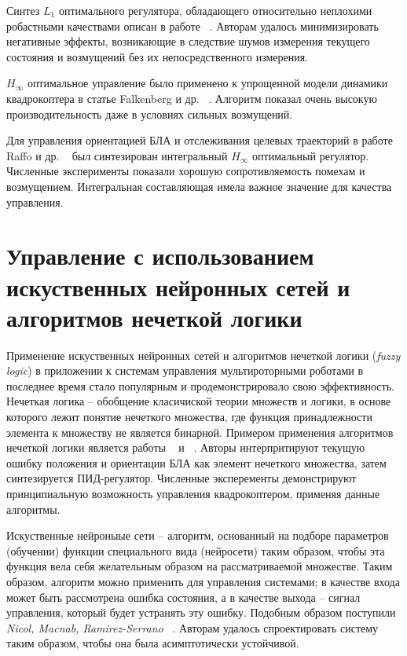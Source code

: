 Синтез $L_1$ оптимального регулятора, обладающего относительно неплохими робастными качествами описан в работе ~\cite{Satici01}. Авторам удалось минимизировать негативные эффекты, возникающие в следствие шумов измерения текущего состояния и возмущений без их непосредственного измерения.

$H_{\infty}$ оптимальное управление было применено к упрощенной модели динамики квадрокоптера в статье Falkenberg и др. ~\cite{Falkenberg01}. Алгоритм показал очень высокую производительность даже в условиях сильных возмущений.

Для управления ориентацией БЛА и отслеживания целевых траекторий в работе Raffo и др. ~\cite{Raffo01} был синтезирован интегральный $H_{\infty}$ оптимальный регулятор. Численные эксперименты показали хорошую сопротивляемость помехам и возмущением. Интегральная составляющая имела важное значение для качества управления.

\section{Управление с использованием искуственных нейронных сетей и алгоритмов нечеткой логики}

Применение искуственных нейронных сетей и алгоритмов нечеткой логики (\textit{fuzzy logic}) в приложении к системам управления мультироторными роботами в последнее время стало популярным и продемонстрировало свою эффективность. Нечеткая логика  -- обобщение класичиской теории множеств и логики, в основе которого лежит понятие нечеткого множества, где функция принадлежности элемента к множеству не является бинарной. Примером применения алгоритмов нечеткой логики является работы ~\cite{Dierks01} и ~\cite{Santos01}. Авторы интерпритируют текущую ошибку положения и ориентации БЛА как элемент нечеткого множества, затем синтезируется ПИД-регулятор. Численные эксперементы демонстрируют принципиальную возможность управления квадрокоптером, применяя данные алгоритмы.


Искуственные нейроныые сети -- алгоритм, основанный на подборе параметров (обучении) функции специального вида (нейросети) таким образом, чтобы эта функция вела себя желательным образом на рассматриваемой множестве. Таким образом, алгоритм можно применить для управления системами; в качестве входа может быть рассмотрена ошибка состояния, а в качестве выхода -- сигнал управления, который будет устранять эту ошибку. Подобным образом поступили \textit{Nicol, Macnab, Ramirez-Serrano} ~\cite{Nicol01}. Авторам удалось спроектировать систему таким образом, чтобы она была асимптотически устойчивой.


